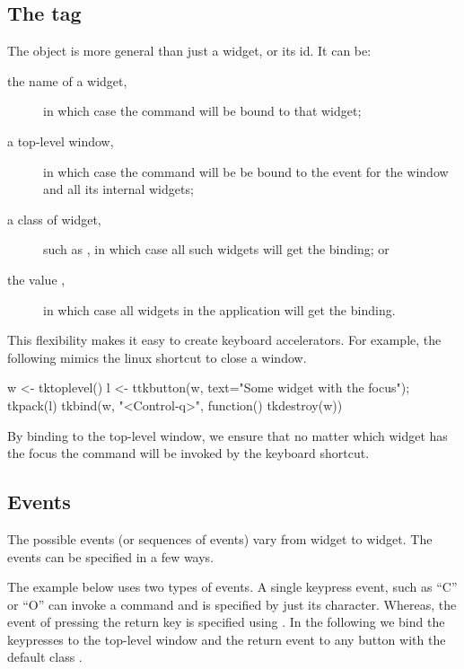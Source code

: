 \subsection{The tag}

The  object is more general than just a widget, or its
id. It can be:

\begin{description}
\item[the name of a widget,] in which case the command will be bound to that widget;
\item[a top-level window,] in which case the command will be be bound
  to the event for the window and all its internal widgets;
\item[a class of widget,] such as , in which case all
  such widgets will get the binding; or
\item[the value ,] in which case all widgets in the
  application will get the binding.
\end{description}

This flexibility makes it easy to create keyboard accelerators. For
example, the following mimics the linux shortcut  to
close a window.
\begin{Schunk}
\begin{Sinput}
 w <- tktoplevel()
 l <- ttkbutton(w, text="Some widget with the focus"); tkpack(l)
 tkbind(w, "<Control-q>", function() tkdestroy(w))
\end{Sinput}
\end{Schunk}

By binding to the top-level window, we ensure that no matter which
widget has the focus the command will be invoked by the keyboard shortcut.


\subsection{Events}
\label{sec:tcltk:events}

The possible events (or sequences of events) vary from widget to
widget. The events can be specified in a few ways. 

The example below uses two types of events. A single keypress event, such as
``C'' or ``O'' can invoke a command and is specified by just its
character. Whereas, the event of pressing the return key is specified
using . In the following we bind the keypresses to the
top-level window and the return event to any button with the default
class .


